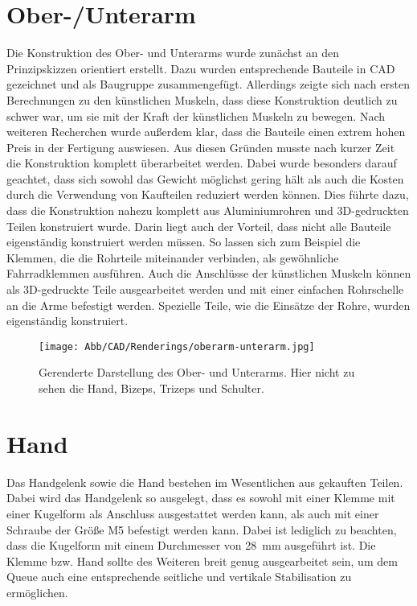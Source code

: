 	\section{Ober-/Unterarm}
		Die Konstruktion des Ober- und Unterarms wurde zunächst an den Prinzipskizzen orientiert erstellt.
		Dazu wurden entsprechende Bauteile in CAD gezeichnet und als Baugruppe zusammengefügt.
		Allerdings zeigte sich nach ersten Berechnungen zu den künstlichen Muskeln, dass diese Konstruktion deutlich zu schwer war, um sie mit der Kraft der künstlichen Muskeln zu bewegen.
		Nach weiteren Recherchen wurde außerdem klar, dass die Bauteile einen extrem hohen Preis in der Fertigung auswiesen.
		Aus diesen Gründen musste nach kurzer Zeit die Konstruktion komplett überarbeitet werden.
		Dabei wurde besonders darauf geachtet, dass sich sowohl das Gewicht möglichst gering hält als auch die Kosten durch die Verwendung von Kaufteilen reduziert werden können.
		Dies führte dazu, dass die Konstruktion nahezu komplett aus Aluminiumrohren und 3D-gedruckten Teilen konstruiert wurde.
		Darin liegt auch der Vorteil, dass nicht alle Bauteile eigenständig konstruiert werden müssen.
		So lassen sich zum Beispiel die Klemmen, die die Rohrteile miteinander verbinden, als gewöhnliche Fahrradklemmen ausführen.
		Auch die Anschlüsse der künstlichen Muskeln können als 3D-gedruckte Teile ausgearbeitet werden und mit einer einfachen Rohrschelle an die Arme befestigt werden.
		Spezielle Teile, wie die Einsätze der Rohre, wurden eigenständig konstruiert.

		\begin{figure}[h]
			\centering
			\texttt{[image: Abb/CAD/Renderings/oberarm-unterarm.jpg]}
			\caption[Gerenderte Darstellung des Ober- und Unterarms]{Gerenderte Darstellung des Ober- und Unterarms. Hier nicht zu sehen die Hand, Bizeps, Trizeps und Schulter.}%
			\label{fig:rendering oberarm unterarm}
		\end{figure}

	\section{Hand}
		Das Handgelenk sowie die Hand bestehen im Wesentlichen aus gekauften Teilen.
		Dabei wird das Handgelenk so ausgelegt, dass es sowohl mit einer Klemme mit einer Kugelform als Anschluss ausgestattet werden kann, als auch mit einer Schraube der Größe M5 befestigt werden kann.
		Dabei ist lediglich zu beachten, dass die Kugelform mit einem Durchmesser von \SI{28}{\milli\metre} ausgeführt ist.
		Die Klemme bzw. Hand sollte des Weiteren breit genug ausgearbeitet sein, um dem Queue auch eine entsprechende seitliche und vertikale Stabilisation zu ermöglichen.

